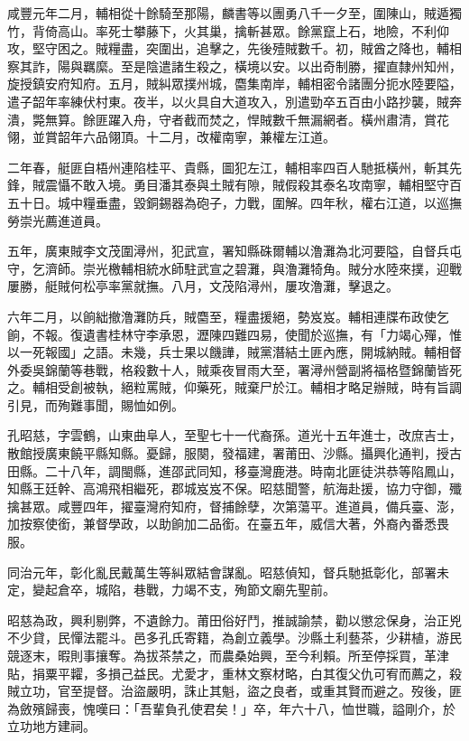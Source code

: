 \begin{pinyinscope}
咸豐元年二月，輔相從十餘騎至那陽，麟書等以團勇八千一夕至，圍陳山，賊遁獨竹，背倚高山。率死士攀藤下，火其巢，擒斬甚眾。餘黨竄上石，地險，不利仰攻，堅守困之。賊糧盡，突圍出，追擊之，先後殪賊數千。初，賊酋之降也，輔相察其詐，陽與羈縻。至是陰遣諸生殺之，橫境以安。以出奇制勝，擢直隸州知州，旋授鎮安府知府。五月，賊糾眾撲州城，麕集南岸，輔相密令諸團分扼水陸要隘，遣子韶年率練伏村東。夜半，以火具自大道攻入，別遣勁卒五百由小路抄襲，賊奔潰，斃無算。餘匪躍入舟，守者截而焚之，悍賊數千無漏網者。橫州肅清，賞花翎，並賞韶年六品翎頂。十二月，改權南寧，兼權左江道。

二年春，艇匪自梧州連陷桂平、貴縣，圖犯左江，輔相率四百人馳抵橫州，斬其先鋒，賊震懾不敢入境。勇目潘其泰與土賊有隙，賊假殺其泰名攻南寧，輔相堅守百五十日。城中糧垂盡，毀銅錫器為砲子，力戰，圍解。四年秋，權右江道，以巡撫勞崇光薦進道員。

五年，廣東賊李文茂圍潯州，犯武宣，署知縣硃爾輔以澛灘為北河要隘，自督兵屯守，乞濟師。崇光檄輔相統水師駐武宣之碧灘，與澛灘犄角。賊分水陸來撲，迎戰屢勝，艇賊何松亭率黨就撫。八月，文茂陷潯州，屢攻澛灘，擊退之。

六年二月，以餉絀撤澛灘防兵，賊麕至，糧盡援絕，勢岌岌。輔相連牒布政使乞餉，不報。復遺書桂林守李承恩，瀝陳四難四易，使聞於巡撫，有「力竭心殫，惟以一死報國」之語。未幾，兵士果以饑譁，賊黨潛結土匪內應，開城納賊。輔相督外委吳錦蘭等巷戰，格殺數十人，賊乘夜冒雨大至，署潯州營副將福格暨錦蘭皆死之。輔相受創被執，絕粒罵賊，仰藥死，賊棄尸於江。輔相才略足辦賊，時有旨調引見，而殉難事聞，賜恤如例。

孔昭慈，字雲鶴，山東曲阜人，至聖七十一代裔孫。道光十五年進士，改庶吉士，散館授廣東饒平縣知縣。憂歸，服闋，發福建，署莆田、沙縣。攝興化通判，授古田縣。二十八年，調閩縣，進邵武同知，移臺灣鹿港。時南北匪徒洪恭等陷鳳山，知縣王廷幹、高鴻飛相繼死，郡城岌岌不保。昭慈聞警，航海赴援，協力守御，殲擒甚眾。咸豐四年，擢臺灣府知府，督捕餘孽，次第蕩平。進道員，備兵臺、澎，加按察使銜，兼督學政，以助餉加二品銜。在臺五年，威信大著，外裔內番悉畏服。

同治元年，彰化亂民戴萬生等糾眾結會謀亂。昭慈偵知，督兵馳抵彰化，部署未定，變起倉卒，城陷，巷戰，力竭不支，殉節文廟先聖前。

昭慈為政，興利剔弊，不遺餘力。莆田俗好鬥，推誠諭禁，勸以懲忿保身，治正兇不少貸，民憚法罷斗。邑多孔氏寄籍，為創立義學。沙縣土利藝茶，少耕植，游民競逐末，暇則事攘奪。為拔茶禁之，而農桑始興，至今利賴。所至停採買，革津貼，捐粟平糶，多損己益民。尤愛才，重林文察材略，白其復父仇可宥而薦之，殺賊立功，官至提督。治盜嚴明，誅止其魁，盜之良者，或重其賢而避之。歿後，匪為斂殯歸喪，愧嘆曰：「吾輩負孔使君矣！」卒，年六十八，恤世職，謚剛介，於立功地方建祠。


\end{pinyinscope}
